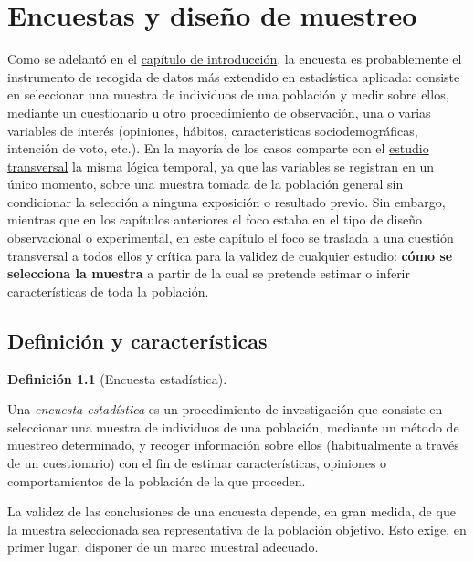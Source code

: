 \documentclass[
  spanish,
  a4paper,
]{scrreport}
\theoremstyle{definition}
\theoremstyle{definition}
\newtheorem{definition}{Definición}[chapter]
\theoremstyle{remark}
\begin{document}
\chapter{Encuestas y diseño de
muestreo}\label{encuestas-y-diseuxf1o-de-muestreo}

Como se adelantó en el
\hyperref[introducciuxf3n-a-los-tipos-de-estudios-estaduxedsticos]{capítulo
de introducción}, la encuesta es probablemente el instrumento de
recogida de datos más extendido en estadística aplicada: consiste en
seleccionar una muestra de individuos de una población y medir sobre
ellos, mediante un cuestionario u otro procedimiento de observación, una
o varias variables de interés (opiniones, hábitos, características
sociodemográficas, intención de voto, etc.). En la mayoría de los casos
comparte con el \hyperref[estudios-transversales]{estudio transversal}
la misma lógica temporal, ya que las variables se registran en un único
momento, sobre una muestra tomada de la población general sin
condicionar la selección a ninguna exposición o resultado previo. Sin
embargo, mientras que en los capítulos anteriores el foco estaba en el
tipo de diseño observacional o experimental, en este capítulo el foco se
traslada a una cuestión transversal a todos ellos y crítica para la
validez de cualquier estudio: \textbf{cómo se selecciona la muestra} a
partir de la cual se pretende estimar o inferir características de toda
la población.

\section{Definición y
características}\label{definiciuxf3n-y-caracteruxedsticas-7}

\begin{definition}[Encuesta
estadística]\protect\hypertarget{def-encuestas-encuesta-estadistica}{}\label{def-encuestas-encuesta-estadistica}

Una \emph{encuesta estadística} es un procedimiento de investigación que
consiste en seleccionar una muestra de individuos de una población,
mediante un método de muestreo determinado, y recoger información sobre
ellos (habitualmente a través de un cuestionario) con el fin de estimar
características, opiniones o comportamientos de la población de la que
proceden.

\end{definition}

La validez de las conclusiones de una encuesta depende, en gran medida,
de que la muestra seleccionada sea representativa de la población
objetivo. Esto exige, en primer lugar, disponer de un marco muestral
adecuado.
\end{document}
